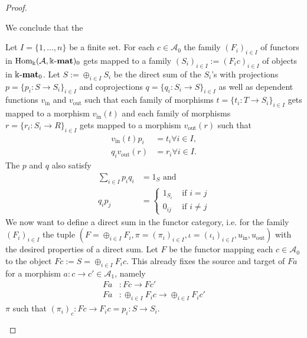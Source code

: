 \begin{proof}
\begin{enumerate}
\begin{subproof}[Proof of (ii)]
We conclude that the 
\end{subproof}

\begin{subproof}[Proof of (ii)]
Let $I = \{1,\dots,n\}$ be a finite set. For each $c \in \mathcal{A}_{0}$ the family $(F_{i})_{i\in I}$ of functors in $\mathrm{Hom_{\Bbbk}}(\mathcal{A},\Bbbk\textnormal{-}\mathbf{mat})_{0}$ gets mapped to a
family $(S_{i})_{i\in I} := (F_{i}c)_{i\in I}$ of objects in $\Bbbk\textnormal{-}\mathbf{mat}_{0}$. Let $S := \oplus_{i\in I} S_{i}$ be the direct sum of the $S_{i}$'s with projections
$p = \{ p_{i} : S \rightarrow S_{i}\}_{i\in I}$ and coprojections $q = \{ q_{i} : S_{i} \rightarrow S\}_{i\in I}$ as well as dependent functions
$v_{\text{in}}$ and $v_{\text{out}}$ such that each family of morphisms $t = \{ t_{i} : T \rightarrow S_{i}\}_{i\in I}$ gets mapped to a
morphism $v_{\text{in}}(t)$ and each family of morphisms $r = \{ r_{i} : S_{i} \rightarrow R\}_{i\in I}$ gets mapped to a
morphism $v_{\text{out}}(r)$ such that
\begin{align*}
v_{\text{in}}(t) p_{i} &= t_{i} \forall i\in I, \\
q_{i} v_{\text{out}}(r) &= r_{i} \forall i\in I.
\end{align*}
The $p$ and $q$ also satisfy
\begin{align*}
\sum_{i\in I} p_{i} q_{i} &= 1_{S} \text{  and  } \\
q_{i} p_{j} &= \begin{cases}
            1_{S_{i}} & \text{ if } i = j \\
            0_{ij} & \text{ if } i \neq j
        \end{cases}
\end{align*}
We now want to define a direct sum in the functor category, i.e. for the family $(F_{i})_{i\in I}$ the tuple
$(F = \oplus_{i\in I} F_{i}, \pi = (\pi_{i})_{i\in I}, \iota = (\iota_{i})_{i\in I}, u_{\text{in}}, u_{\text{out}})$ with the desired properties of a direct sum.
Let $F$ be the functor mapping each $c\in \mathcal{A}_{0}$ to the object $Fc := S = \oplus_{i\in I} F_{i}c$. This already fixes the source and target of
$Fa$ for a morphism $a : c \rightarrow c' \in \mathcal{A}_{1}$, namely
\begin{align*}
Fa &: Fc \rightarrow Fc' \\
Fa &: \oplus_{i\in I} F_{i}c \rightarrow \oplus_{i\in I} F_{i}c'
\end{align*}
$\pi$ such that $(\pi_{i})_{c} : Fc \rightarrow F_{i}c = p_{i} : S \rightarrow S_{i}$.
\end{subproof}


\end{enumerate}
\end{proof}

